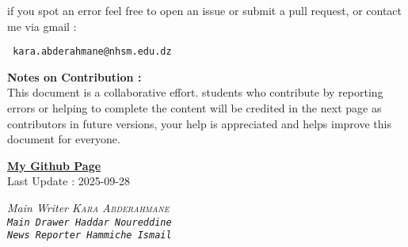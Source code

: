\documentclass{report}
\begin{document}
\begin{titlepage}
  \begin{center}
    if you spot an error feel free to open an issue or
    submit a pull request, or contact me
    via gmail :
  \end{center}
  \begin{center}
    \normalfont
    \texttt{
      \large kara.abderahmane@nhsm.edu.dz
      \normalfont
    }
  \end{center}
  \noindent \textbf{Notes on Contribution : } \\
  This document is a collaborative effort.
  students who contribute by reporting errors or helping to complete the content
  will be credited in the next page as contributors in future versions,
  your help is appreciated and helps improve this document for everyone.
\end{titlepage}
\begin{titlepage}
  \newpage
  \normalfont
  \vfill
  \begin{center}
    \href{https://github.com/Kapa9102}{\textbf{My Github Page}}\\
    \vspace{0.8cm}
    Last Update : 2025-09-28
  \end{center}
  \begin{tcolorbox}[enhanced, colback=yellow!70!orange!20!white, sharp corners, boxrule=1pt,
    attach boxed title to top center = {yshift = -10pt, xshift = 0pt}, colbacktitle=yellow!30!orange!20!white,
    boxed title style = {boxrule=0pt, arc=4pt}, title=\sc\textcolor{black}{Contributors}]
    \begin{center}
      \it Main Writer \hfill \normalfont  \textsc{Kara Abderahmane}  \\
      \vspace{0.5cm}
      \tt Main Drawer \hfill \normalfont  \tt{Haddar Noureddine}  \\
      \vspace{0.5cm}
      \tt News Reporter \hfill \normalfont  \tt{Hammiche Ismail}  \\
    \end{center}
  \end{tcolorbox}
\end{titlepage}

\tableofcontents





\end{document}

